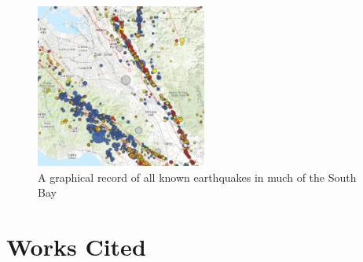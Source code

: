\documentclass[12pt]{article}
\begin{document}
\begin{figure}[!h]
    \centering
    \includegraphics[width=0.5\textwidth]{bayareaquakes.PNG}
    \caption{A graphical record of all known earthquakes in much of the South Bay}
    \label{fig:baq}
\end{figure}

\section*{Works Cited}
\end{document}
